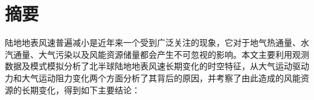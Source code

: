 \maketitle%
\MAKETITLE%
\makedeclaration%
\intobmk\chapter*{摘\quad 要}%
\setcounter{page}{1}%

陆地地表风速普遍减小是近年来一个受到广泛关注的现象，它对于地气热通量、水汽通量、大气污染以及风能资源储量都会产生不可忽视的影响。本文主要利用观测数据及模式模拟分析了北半球陆地地表风速长期变化的时空特征，从大气运动驱动力和大气运动阻力变化两个方面分析了其背后的原因，并考察了由此造成的风能资源的长期变化，得到如下主要结论：

